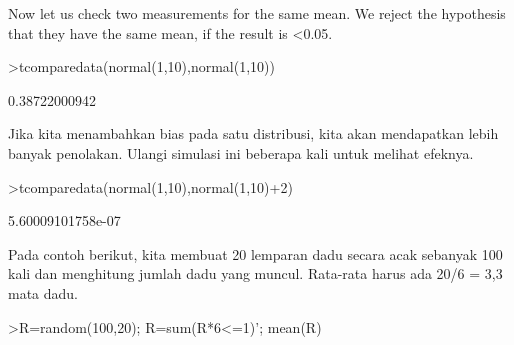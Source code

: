 \documentclass[a4paper,10pt]{article}
\begin{document}
\begin{eulernotebook}
\begin{eulercomment}
\begin{eulercomment}
\begin{eulercomment}
\begin{eulercomment}
\begin{eulercomment}
\begin{eulercomment}
\begin{eulercomment}
\begin{eulercomment}
\begin{eulercomment}
\begin{eulercomment}
\begin{eulercomment}
\begin{eulercomment}
\begin{eulercomment}
\begin{eulercomment}
\begin{eulercomment}
\begin{eulercomment}
\begin{eulercomment}
\begin{eulercomment}
\begin{eulercomment}
\begin{eulercomment}
\begin{eulercomment}
\begin{eulercomment}
\begin{eulercomment}
\begin{eulercomment}
\begin{eulercomment}
\begin{eulercomment}
\begin{eulercomment}
\begin{eulercomment}
\begin{eulercomment}
\begin{eulercomment}
\begin{eulercomment}
\begin{eulercomment}
\begin{eulercomment}
\begin{eulercomment}
\begin{eulercomment}
\begin{eulercomment}
\begin{eulercomment}
\begin{eulercomment}
\begin{eulercomment}
\begin{eulercomment}
\begin{eulercomment}
\begin{eulercomment}
\begin{eulercomment}
\begin{eulercomment}
\begin{eulercomment}
Now let us check two measurements for the same mean. We reject the
hypothesis that they have the same mean, if the result is \textless{}0.05.
\end{eulercomment}
\begin{eulerprompt}
>tcomparedata(normal(1,10),normal(1,10))
\end{eulerprompt}
\begin{euleroutput}
  0.38722000942
\end{euleroutput}
\begin{eulercomment}
Jika kita menambahkan bias pada satu distribusi, kita akan mendapatkan
lebih banyak penolakan. Ulangi simulasi ini beberapa kali untuk
melihat efeknya.
\end{eulercomment}
\begin{eulerprompt}
>tcomparedata(normal(1,10),normal(1,10)+2)
\end{eulerprompt}
\begin{euleroutput}
  5.60009101758e-07
\end{euleroutput}
\begin{eulercomment}
Pada contoh berikut, kita membuat 20 lemparan dadu secara acak
sebanyak 100 kali dan menghitung jumlah dadu yang muncul. Rata-rata
harus ada 20/6 = 3,3 mata dadu.
\end{eulercomment}
\begin{eulerprompt}
>R=random(100,20); R=sum(R*6<=1)'; mean(R)
\end{eulerprompt}

\end{eulercomment}
\end{eulercomment}
\end{eulercomment}
\end{eulercomment}
\end{eulercomment}
\end{eulercomment}
\end{eulercomment}
\end{eulercomment}
\end{eulercomment}
\end{eulercomment}
\end{eulercomment}
\end{eulercomment}
\end{eulercomment}
\end{eulercomment}
\end{eulercomment}
\end{eulercomment}
\end{eulercomment}
\end{eulercomment}
\end{eulercomment}
\end{eulercomment}
\end{eulercomment}
\end{eulercomment}
\end{eulercomment}
\end{eulercomment}
\end{eulercomment}
\end{eulercomment}
\end{eulercomment}
\end{eulercomment}
\end{eulercomment}
\end{eulercomment}
\end{eulercomment}
\end{eulercomment}
\end{eulercomment}
\end{eulercomment}
\end{eulercomment}
\end{eulercomment}
\end{eulercomment}
\end{eulercomment}
\end{eulercomment}
\end{eulercomment}
\end{eulercomment}
\end{eulercomment}
\end{eulercomment}
\end{eulercomment}
\end{eulernotebook}
\end{document}
